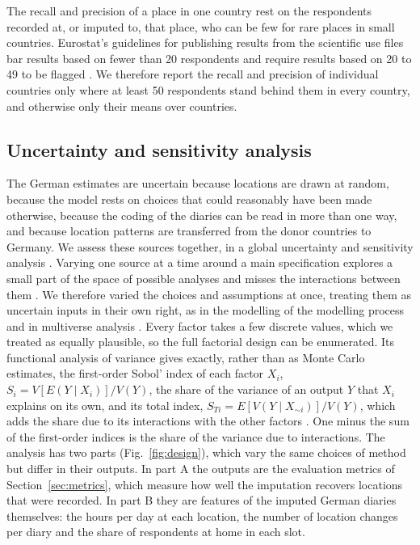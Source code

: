 \documentclass[a4paper]{article}
\begin{document}
The recall and precision of a place in one country rest on the respondents recorded at, or imputed to, that place, who can be few for rare places in small countries. Eurostat's guidelines for publishing results from the scientific use files bar results based on fewer than 20 respondents and require results based on 20 to 49 to be flagged \parencite{eurostatGuidelinesPublication2026}. We therefore report the recall and precision of individual countries only where at least 50 respondents stand behind them in every country, and otherwise only their means over countries.

\subsection{Uncertainty and sensitivity analysis}
\label{sec:uncertainty}

The German estimates are uncertain because locations are drawn at random, because the model rests on choices that could reasonably have been made otherwise, because the coding of the diaries can be read in more than one way, and because location patterns are transferred from the donor countries to Germany. We assess these sources together, in a global uncertainty and sensitivity analysis \parencite{saltelliGlobalSensitivityAnalysis2008b}. Varying one source at a time around a main specification explores a small part of the space of possible analyses and misses the interactions between them \parencite{saltelliHowAvoidPerfunctory2010}. We therefore varied the choices and assumptions at once, treating them as uncertain inputs in their own right, as in the modelling of the modelling process \parencite{lopianoUnpackingModelingProcess2024,saltelliMathematicalModelsState2025} and in multiverse analysis \parencite{steegenIncreasingTransparencyMultiverse2016}. Every factor takes a few discrete values, which we treated as equally plausible, so the full factorial design can be enumerated. Its functional analysis of variance gives exactly, rather than as Monte Carlo estimates, the first-order Sobol' index of each factor $X_i$, $S_i = V[E(Y \mid X_i)]/V(Y)$, the share of the variance of an output $Y$ that $X_i$ explains on its own, and its total index, $S_{Ti} = E[V(Y \mid X_{\sim i})]/V(Y)$, which adds the share due to its interactions with the other factors \parencite{sobolGlobalSensitivityIndices2001,hommaImportanceMeasuresGlobal1996}. One minus the sum of the first-order indices is the share of the variance due to interactions. The analysis has two parts (Fig.~\ref{fig:design}), which vary the same choices of method but differ in their outputs. In part A the outputs are the evaluation metrics of Section~\ref{sec:metrics}, which measure how well the imputation recovers locations that were recorded. In part B they are features of the imputed German diaries themselves: the hours per day at each location, the number of location changes per diary and the share of respondents at home in each slot.
\end{document}
